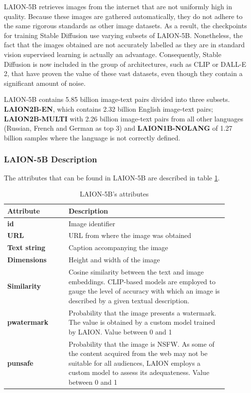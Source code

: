 LAION-5B retrieves images from the internet that are not uniformly high in quality. Because these images are gathered automatically, they do not adhere to the same rigorous standards as other image datasets. As a result, the checkpoints for training Stable Diffusion use varying subsets of LAION-5B. Nonetheless, the fact that the images obtained are not accurately labelled as they are in standard vision supervised learning is actually an advantage. Consequently, Stable Diffusion is now included in the group of architectures, such as CLIP or DALL-E 2, that have proven the value of these vast datasets, even though they contain a significant amount of noise.

LAION-5B contains 5.85 billion image-text pairs divided into three subsets. \textbf{LAION2B-EN}, which contains 2.32 billion English image-text pairs; \textbf{LAION2B-MULTI} with 2.26 billion image-text pairs from all other languages (Russian, French and German as top 3) and \textbf{LAION1B-NOLANG} of 1.27 billion samples where the language is not correctly defined. 

\subsubsection{LAION-5B Description}

The attributes that can be found in LAION-5B are described in table \ref{table:TableLaionAttributes}.

\begin{table}[ht]
\centering
\begin{tabular}{|p{0.25\linewidth} | p{0.65\linewidth}|}
\hline
\rowcolor[HTML]{9B9B9B} 
{\textbf{Attribute}} & {\textbf{Description}} \\ \hline
\textbf{id} & Image identifier \\ \hline
\textbf{URL} & URL from where the image was obtained \\ \hline
\textbf{Text string} & Caption accompanying the image \\ \hline
\textbf{Dimensions} & Height and width of the image \\ \hline
\textbf{Similarity} & Cosine similarity between the text and image embeddings. CLIP-based   models are employed to gauge the level of accuracy with which an image is   described by a given textual description.\\ \hline
\textbf{pwatermark} & Probability that the image presents a watermark. The value is   obtained by a custom model trained by LAION. Value between 0 and 1 \\ \hline
\textbf{punsafe} & Probability that the image is NSFW. As some of the content   acquired from the web may not be suitable for all audiences, LAION employs a   custom model to assess its adequateness. Value between 0 and 1 \\ \hline
\end{tabular}
\caption{LAION-5B’s attributes}
\label{table:TableLaionAttributes}
\end{table}

